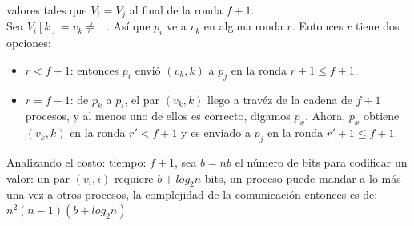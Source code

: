 \documentclass{article}
\begin{document}
\begin{enumerate}
{\begin{itemize}
{        valores tales que $V_{i} = V_{j}$ al final de la ronda $f + 1$.\\
        Sea  $V_{i}[k] = v_{k} \neq \bot$. Así que $p_{i}$ ve a $v_{k}$ en alguna
        ronda $r$. Entonces $r$ tiene dos opciones:
        \begin{itemize}
          \item {$r < f + 1$: entonces $p_{i}$ envió $(v_{k}, k)$ a $p_{j}$ en
          la ronda $r + 1 \leqslant f + 1$. }
          \item {$r = f + 1$: de $p_{k}$ a $p_{i}$, el par $(v_{k}, k)$ llego a travéz
          de la cadena de $f + 1$ procesos, y al menos uno de ellos es correcto,
          digamos $p_{x}$. Ahora, $p_{x}$ obtiene $(v_{k}, k)$ en la ronda $r' < f + 1$
          y es enviado a $p_{j}$ en la ronda $r' + 1 \leqslant f + 1$.}
        \end{itemize}
        }
      \end{itemize}
      Analizando el costo: tiempo: $f + 1$, sea $b = nb$ el número de bits para
      codificar un valor: un par $(v_{i}, i)$ requiere $b + log_{2}n$ bits, un
      proceso puede mandar a lo más una vez a otros procesos, la complejidad de
      la comunicación entonces es de:\\
      $n^{2}(n - 1)(b + log_{2}n)$


    }
    
\end{enumerate}
\end{document}
